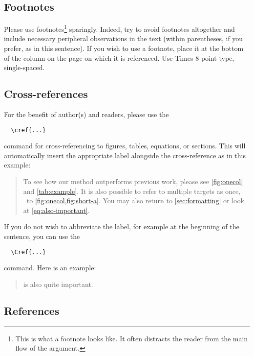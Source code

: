 \documentclass[10pt,twocolumn,letterpaper]{article}
\begin{document}
\subsection{Footnotes}

Please use footnotes\footnote{This is what a footnote looks like.
It often distracts the reader from the main flow of the argument.} sparingly.
Indeed, try to avoid footnotes altogether and include necessary peripheral observations in the text (within parentheses, if you prefer, as in this sentence).
If you wish to use a footnote, place it at the bottom of the column on the page on which it is referenced.
Use Times 8-point type, single-spaced.


\subsection{Cross-references}

For the benefit of author(s) and readers, please use the
{\small\begin{verbatim}
  \cref{...}
\end{verbatim}}  command for cross-referencing to figures, tables, equations, or sections.
This will automatically insert the appropriate label alongside the cross-reference as in this example:
\begin{quotation}
  To see how our method outperforms previous work, please see \cref{fig:onecol} and \cref{tab:example}.
  It is also possible to refer to multiple targets as once, \eg~to \cref{fig:onecol,fig:short-a}.
  You may also return to \cref{sec:formatting} or look at \cref{eq:also-important}.
\end{quotation}
If you do not wish to abbreviate the label, for example at the beginning of the sentence, you can use the
{\small\begin{verbatim}
  \Cref{...}
\end{verbatim}}
command. Here is an example:
\begin{quotation}
   is also quite important.
\end{quotation}

\subsection{References}
\end{document}
